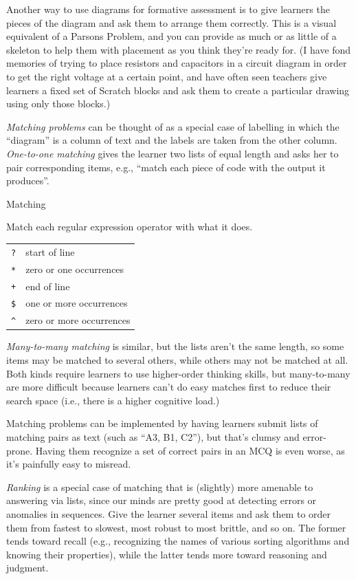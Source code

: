 Another way to use diagrams for formative assessment is to give learners
the pieces of the diagram and ask them to arrange them correctly. This
is a visual equivalent of a Parsons Problem, and you can provide as much
or as little of a skeleton to help them with placement as you think
they're ready for. (I have fond memories of trying to place resistors
and capacitors in a circuit diagram in order to get the right voltage at
a certain point, and have often seen teachers give learners a fixed set
of Scratch blocks and ask them to create a particular drawing using only
those blocks.)

\emph{Matching problems} can be thought of as a special case of labelling in
which the ``diagram'' is a column of text and the labels are taken from
the other column. \emph{One-to-one matching} gives the learner two lists of
equal length and asks her to pair corresponding items, e.g., ``match each
piece of code with the output it produces''.

\begin{aside}{Matching}

Match each regular expression operator with what it does.

\begin{longtable}[]{@{}ll@{}}
\texttt{?} & start of line\tabularnewline
\texttt{*} & zero or one occurrences\tabularnewline
\texttt{+} & end of line\tabularnewline
\texttt{\$} & one or more occurrences\tabularnewline
\texttt{\^{}} & zero or more occurrences\tabularnewline
\end{longtable}

\end{aside}

\emph{Many-to-many matching} is similar, but the lists aren't the same
length, so some items may be matched to several others, while others may
not be matched at all. Both kinds require learners to use higher-order
thinking skills, but many-to-many are more difficult because learners
can't do easy matches first to reduce their search space (i.e., there is
a higher cognitive load.)

Matching problems can be implemented by having learners submit lists of
matching pairs as text (such as ``A3, B1, C2''), but that's clumsy and
error-prone. Having them recognize a set of correct pairs in an MCQ is
even worse, as it's painfully easy to misread.

\emph{Ranking} is a special case of matching that is (slightly) more amenable
to answering via lists, since our minds are pretty good at detecting
errors or anomalies in sequences. Give the learner several items and ask
them to order them from fastest to slowest, most robust to most brittle,
and so on. The former tends toward recall (e.g., recognizing the names
of various sorting algorithms and knowing their properties), while the
latter tends more toward reasoning and judgment.

